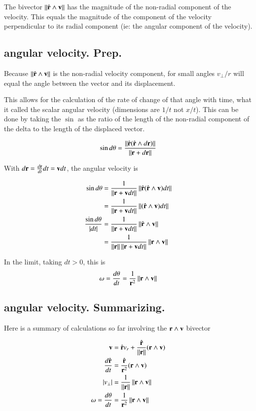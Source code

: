 \documentclass{article}      %
\newcommand{\dt}[1]{\frac{d {#1}}{dt}}
\newcommand{\Norm}[1]{\left\lVert{#1}\right\rVert}
\begin{document}
The bivector $\Norm{\rcap \wedge \Bv}$ has the magnitude of the non-radial component of the velocity.  This
equals the magnitude of the component of the velocity perpendicular to its radial component (ie: the angular component of the velocity).

\subsection{angular velocity.  Prep.}

Because $\Norm{\rcap \wedge \Bv}$ is the non-radial velocity component, for small angles
${v_\perp}/r$ will equal the angle between the vector and its displacement.

This allows for the calculation of the rate of change of that angle with time, what it called the scalar
angular velocity (dimensions are $1/t$ not $x/t$).  This can be done by taking the $\sin$ as the ratio of the
length of the non-radial component of the delta to the length of the displaced vector.

\begin{align*}
\sin d\theta &= \frac{\Norm{\rcap(\rcap \wedge d\Br)}}{\Norm{\Br + d\Br}} \\
\end{align*}

With $d\Br = \dt{\Br} dt = \Bv dt$, the angular velocity is

\begin{align*}
\sin d\theta
   &= \frac{1}{\Norm{\Br + \Bv dt}} \Norm{ \rcap (\rcap \wedge \Bv) dt } \\
   &= \frac{1}{\Norm{\Br + \Bv dt}} \Norm{ (\rcap \wedge \Bv) dt } \\
\frac{\sin d\theta}{\abs{dt}}
   &= \frac{1}{\Norm{\Br + \Bv dt}} \Norm{ \rcap \wedge \Bv } \\
   &= \frac{1}{\Norm{\Br}\Norm{\Br + \Bv dt}} \Norm{ \Br \wedge \Bv } \\
\end{align*}

In the limit, taking $dt > 0$, this is
\[
\omega = \dt{\theta} = \frac{1}{\Br^2} \Norm{ \Br \wedge \Bv }
\]

\subsection{angular velocity.  Summarizing.}

Here is a summary of calculations so far involving the $\mathbf{r} \wedge \mathbf{v}$ bivector

\begin{align*}
\Bv &= \rcap v_r + \frac{\rcap}{\Norm{\Br}} (\Br \wedge \Bv) \\
\dt{\rcap} &= \frac{\rcap}{\Br^2} (\Br \wedge \Bv) \\
\abs{v_{\perp}} &= \frac{1}{\Norm{\Br}} \Norm{ \Br \wedge \Bv } \\
\omega = \dt{\theta} &= \frac{1}{\Br^2} \Norm{ \Br \wedge \Bv } \\
\end{align*}
\end{document}
